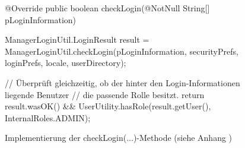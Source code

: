 \begin{figure}[htp] 
    \centering
	\begin{spacing}{0.75}
		\begin{javacode}[firstnumber=25]
@Override
public boolean checkLogin(@NotNull String[] pLoginInformation)
{
  ManagerLoginUtil.LoginResult result = ManagerLoginUtil.checkLogin(pLoginInformation, 
                                         securityPrefs, loginPrefs, locale, userDirectory);
  
  // Überprüft gleichzeitig, ob der hinter den Login-Informationen liegende Benutzer
  // die passende Rolle besitzt.
  return result.wasOK() && UserUtility.hasRole(result.getUser(), InternalRoles.ADMIN);
} 		\end{javacode}
	\end{spacing}
	\caption{Implementierung der \glqq checkLogin(...)\grqq-Methode (siehe Anhang )}
\end{figure}